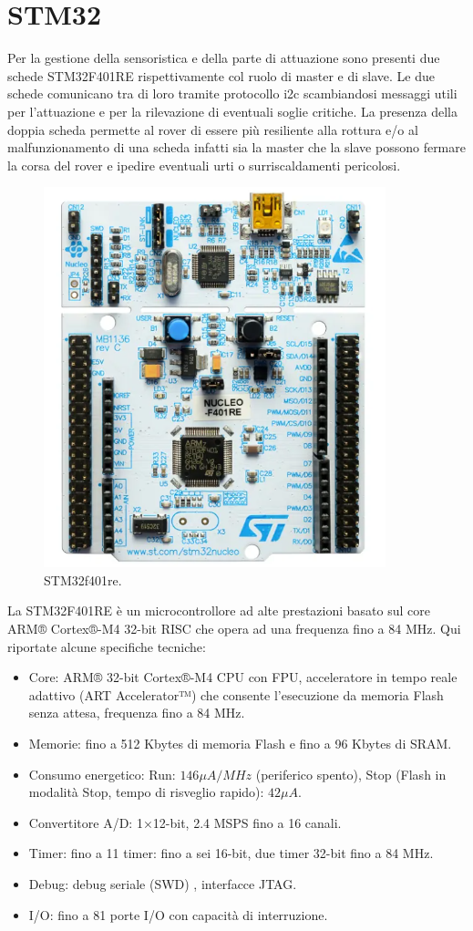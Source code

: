 \documentclass{article}
\begin{document}
\section{STM32}
Per la gestione della sensoristica e della parte di attuazione sono presenti due schede STM32F401RE rispettivamente col ruolo di master e di slave.
Le due schede comunicano tra di loro tramite protocollo i2c scambiandosi messaggi utili per l'attuazione e per la rilevazione di eventuali soglie critiche. La presenza della doppia scheda permette al rover di essere più resiliente alla rottura e/o al malfunzionamento di una scheda infatti sia la master che la slave possono fermare la corsa del rover e ipedire eventuali urti o surriscaldamenti pericolosi.

\begin{figure}[H]
\centering
\includegraphics[width=0.5\linewidth]{image/stm32.png}
\caption{\label{fig:STM32}STM32f401re.}
\end{figure}

La STM32F401RE è un microcontrollore ad alte prestazioni basato sul core ARM® Cortex®-M4 32-bit RISC che opera ad una frequenza fino a 84 MHz. Qui riportate alcune specifiche tecniche:
\begin{itemize}
\item Core: ARM® 32-bit Cortex®-M4 CPU con FPU, acceleratore in tempo reale adattivo (ART Accelerator™) che consente l'esecuzione da memoria Flash senza attesa, frequenza fino a 84 MHz.
\item Memorie: fino a 512 Kbytes di memoria Flash e fino a 96 Kbytes di SRAM.
\item Consumo energetico: Run: $146 \mu A/MHz$ (periferico spento), Stop (Flash in modalità Stop, tempo di risveglio rapido): $42 \mu A$.

\item Convertitore A/D: 1×12-bit, 2.4 MSPS fino a 16 canali.
\item Timer: fino a 11 timer: fino a sei 16-bit, due timer 32-bit fino a 84 MHz.
\item Debug: debug seriale (SWD) , interfacce JTAG.
\item I/O: fino a 81 porte I/O con capacità di interruzione.
\end{itemize}
\newpage
\end{document}
